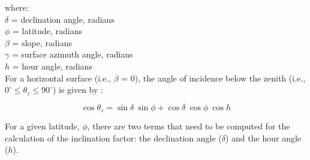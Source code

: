 \noindent where: \\
\indent $\delta$ = declination angle, radians \\
\indent $\phi$ = latitude, radians \\
\indent $\beta$ = slope, radians \\
\indent $\gamma$ = surface azimuth angle, radians \\
\indent $h$ = hour angle, radians \\

For a horizontal surface (i.e., $\beta$ = 0), the angle of incidence below the zenith (i.e., $0^{\circ} \leq \theta_z \leq 90^{\circ}$) is given by \parencite{wetherald72, duffie13, loutre03}:

\begin{equation}
\label{eq:thetaz}
	\cos \theta_z = \sin\delta\: \sin\phi + 
	                \cos\delta\: \cos\phi\: \cos h
\end{equation}

For a given latitude, $\phi$, there are two terms that need to be computed for the calculation of the inclination factor: the declination angle ($\delta$) and the hour angle ($h$).

